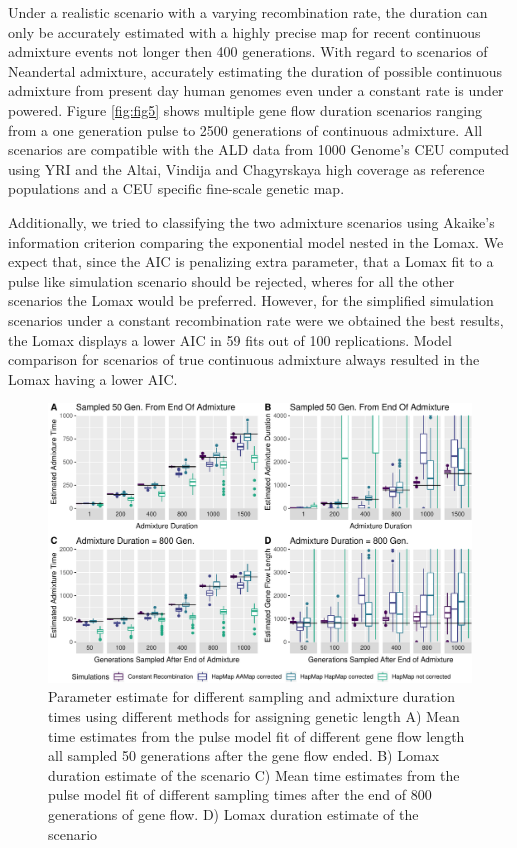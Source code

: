 \documentclass[]{article}
\begin{document}
Under a realistic scenario with a varying recombination
rate, the duration can only be accurately estimated with a highly
precise map for recent continuous admixture events not longer then 400
generations. With regard to scenarios of Neandertal admixture,
accurately estimating the duration of possible continuous admixture from
present day human genomes even under a constant rate is
under powered. 
Figure \ref{fig:fig5} shows multiple gene flow duration scenarios ranging from a one generation pulse to 2500 generations of continuous admixture. All scenarios are compatible with the ALD data from 1000 Genome's CEU computed using YRI and the Altai, Vindija and Chagyrskaya high coverage as reference populations and a CEU specific fine-scale genetic map.


Additionally, we tried to classifying the two admixture scenarios using  Akaike's information
criterion comparing the exponential model nested in the Lomax. We expect
that, since the AIC is penalizing extra parameter, that a Lomax fit to a
pulse like simulation scenario should be rejected, wheres for all the
other scenarios the Lomax would be preferred. However, for the
simplified simulation scenarios under a constant recombination rate were
we obtained the best results, the Lomax displays a lower AIC in 59 fits
out of 100 replications. Model comparison for scenarios of true
continuous admixture always resulted in the Lomax having a lower AIC.

\begin{figure}
\centering
\includegraphics{Admixture_Time_Inference_Paper_Draft_files/figure-latex/fig4-1.pdf}
\caption{\label{fig:fig4} Parameter estimate for different sampling and
admixture duration times using different methods for assigning genetic
length A) Mean time estimates from the pulse model fit of different gene
flow length all sampled 50 generations after the gene flow ended. B)
Lomax duration estimate of the scenario C) Mean time estimates from the
pulse model fit of different sampling times after the end of 800
generations of gene flow. D) Lomax duration estimate of the scenario}
\end{figure}
\end{document}
